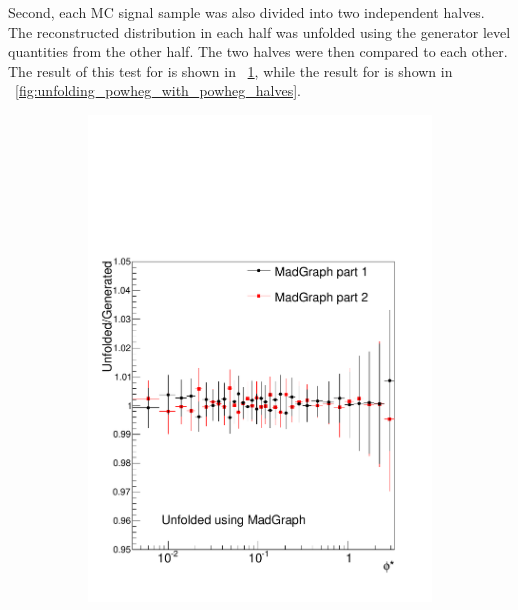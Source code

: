 Second, each MC signal sample was also divided into two independent halves. The
reconstructed \phistar distribution in each half was unfolded using the
generator level quantities from the other half. The two halves were then
compared to each other. The result of this test for \MADGRAPH is shown in
\FIG~\ref{fig:unfolding_madgraph_with_madgraph_halves}, while the result for
\POWHEG is shown in \FIG~\ref{fig:unfolding_powheg_with_powheg_halves}.

\begin{figure}[!htbp]
    \centering
    \begin{subfigure}[b]{\SideBySidePlotWidth}
        \includegraphics[width=\textwidth]{figures/BinM_M1M2.pdf}
        \caption{}
        \label{fig:unfolding_madgraph_with_madgraph_halves}
    \end{subfigure}%
    \begin{subfigure}[b]{\SideBySidePlotWidth}

\end{subfigure}
\end{figure}

